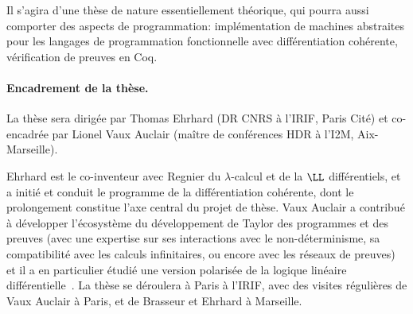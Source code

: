 \documentclass[a4]{article}
\begin{document}
Il s'agira d'une thèse de nature essentiellement théorique, qui pourra
aussi comporter des aspects de programmation: implémentation de
machines abstraites pour les langages de programmation fonctionnelle
avec différentiation cohérente, vérification de preuves en Coq.


\paragraph*{Encadrement de la thèse.}
La thèse sera dirigée par Thomas Ehrhard (DR CNRS à l’IRIF, Paris
Cité) et co-encadrée par Lionel Vaux Auclair (maître de conférences HDR à
l’I2M, Aix-Marseille).

Ehrhard est le co-inventeur avec Regnier du $\lambda$-calcul et de la $\LL$
différentiels, et a initié et conduit le programme de la différentiation
cohérente, dont le prolongement constitue l’axe central du projet de thèse.
Vaux Auclair a contribué à développer l’écosystème du développement de Taylor
des programmes et des preuves (avec une expertise sur ses interactions avec le
non-déterminisme, sa compatibilité avec les calculs infinitaires, 
ou encore avec les réseaux de preuves) et il a en particulier étudié une
version polarisée de la logique linéaire diffé\-ren\-tielle~\cite{Vaux09a}.
%
La thèse se déroulera à Paris à l’IRIF, avec des visites régulières de Vaux
Auclair à Paris, et de Brasseur et Ehrhard à Marseille.



\end{document}
